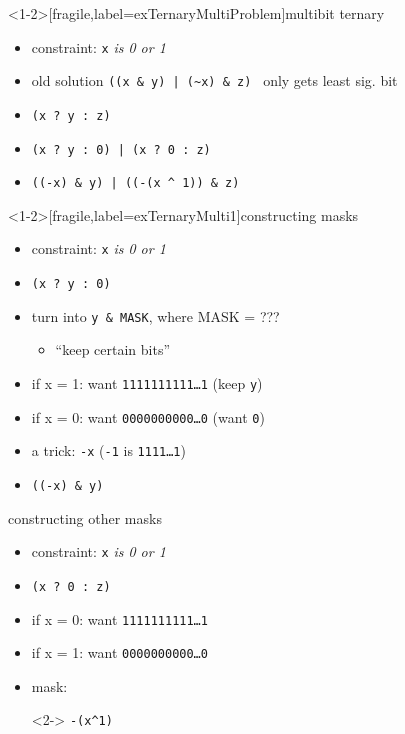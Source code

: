 \begin{frame}<1-2>[fragile,label=exTernaryMultiProblem]{multibit ternary}
    \begin{itemize}
        \item constraint: \lstinline|x| \textit{is 0 or 1}
        \item old solution \lstinline+((x & y) | (~x) & z) + only gets least sig. bit
        \item \lstinline|(x ? y : z)|
        \item<2-> {\color{green!70!black}\lstinline+(x ? y : 0)+}\lstinline+ | +{\color{blue!70!black}\lstinline+(x ? 0 : z)+}
        \item<3-> {\color{green!70!black}\lstinline+((-x) & y)+}\lstinline+ | +{\color{blue!70!black}\lstinline+((-(x ^ 1)) & z)+}
    \end{itemize}
\end{frame}

\begin{frame}<1-2>[fragile,label=exTernaryMulti1]{constructing masks}
    \begin{itemize}
        \item constraint: \lstinline|x| \textit{is 0 or 1}
        \item \lstinline|(x ? y : 0)|
        \item turn into \lstinline|y & MASK|, where MASK = ???
            \begin{itemize}
            \item ``keep certain bits''
            \end{itemize}
        \item<2-> if x = 1: want {\tt 1111111111\ldots1} (keep {\tt y})
        \item<2-> if x = 0: want {\tt 0000000000\ldots0} (want {\tt 0})
            \vspace{.5cm}
        \item<3-> a trick: \lstinline|-x| ({\tt -1} is {\tt 1111\ldots1})
        \item<4-> \lstinline[basicstyle=\color{red}\tt]|((-x) & y)|
    \end{itemize}
\end{frame}



\begin{frame}[fragile,label=exTernaryMulti2]{constructing other masks}
    \begin{itemize}
        \item constraint: \lstinline|x| \textit{is 0 or 1}
        \item \lstinline|(x ? 0 : z)|
        \item if x =  0: want {\tt 1111111111\ldots1}
        \item if x =  1: want {\tt 0000000000\ldots0}
        \item mask:  \begin{visibleenv}<2-> \lstinline|-(x^1)|\end{visibleenv}
    \end{itemize}
\end{frame}

